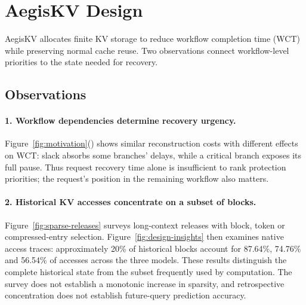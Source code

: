 \section{AegisKV Design}
\label{sec:design}

AegisKV allocates finite KV storage to reduce workflow completion time
(WCT) while preserving normal cache reuse. Two observations connect
workflow-level priorities to the state needed for recovery.

\subsection{Observations}
\label{sec:design-insights}

\paragraph{1. Workflow dependencies determine recovery urgency.}
Figure~\ref{fig:motivation}() shows similar reconstruction
costs with different effects on WCT: slack absorbs some branches' delays,
while a critical branch exposes its full pause. Thus request recovery
time alone is insufficient to rank protection priorities; the request's
position in the remaining workflow also matters.

\paragraph{2. Historical KV accesses concentrate on a subset of blocks.}
Figure~\ref{fig:sparse-releases} surveys long-context releases with block,
token or compressed-entry selection. Figure~\ref{fig:design-insights}
then examines native access traces: approximately 20\% of historical
blocks account for 87.64\%, 74.76\% and 56.54\% of accesses across the
three models. These results distinguish the complete historical state
from the subset frequently used by computation. The survey does not
establish a monotonic increase in sparsity, and retrospective concentration
does not establish future-query prediction accuracy.

